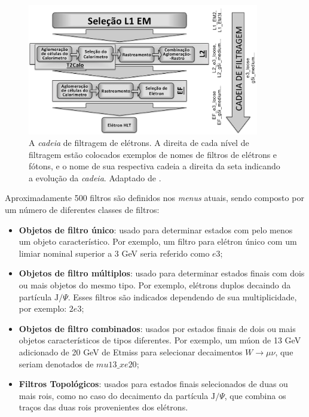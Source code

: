 \begin{figure}[ht!]
\label{fig:electron_chain}
\centering
\includegraphics[width=0.9\textwidth]{imagens/cadeia_eletron.pdf}
\caption[A \emph{cadeia} de filtragem de elétrons.]{A \emph{cadeia} de filtragem
de elétrons. A direita de cada nível de filtragem estão colocados exemplos de
nomes de filtros de elétrons e fótons, e o nome de sua respectiva cadeia a
direita da seta indicando a evolução da \emph{cadeia}. Adaptado de \cite{trigger_perf_2010}.}
\end{figure}

Aproximadamente 500 filtros são definidos nos \emph{menus} atuais, sendo
composto por um número de diferentes classes de filtros:

\begin{itemize}
\item \textbf{Objetos de filtro único}: usado para determinar estados com pelo
menos um objeto característico. Por exemplo, um filtro para elétron único com um
limiar nominal superior a 3 GeV seria referido como $e3$;
\item \textbf{Objetos de filtro múltiplos}: usado para determinar estados finais
com dois ou mais objetos do mesmo tipo. Por exemplo, elétrons duplos decaindo da
partícula $\text{J}/\Psi$. Esses filtros são indicados dependendo de sua
multiplicidade, por exemplo: $2e3$;
\item \textbf{Objetos de filtro combinados}: usados por estados finais de dois
ou mais objetos característicos de tipos diferentes. Por exemplo, um múon de 13
GeV adicionado de 20 GeV de \gls{Etmiss} para selecionar decaimentos
$W\rightarrow \mu\nu$, que seriam denotados de $mu13\_xe20$;
\item \textbf{Filtros Topológicos}: usados para estados finais selecionados de
duas ou mais \glspl{roi}, como no caso do decaimento da partícula
$\text{J}/\Psi$, que combina os traços das duas \glspl{roi} provenientes dos
elétrons.
\end{itemize}

